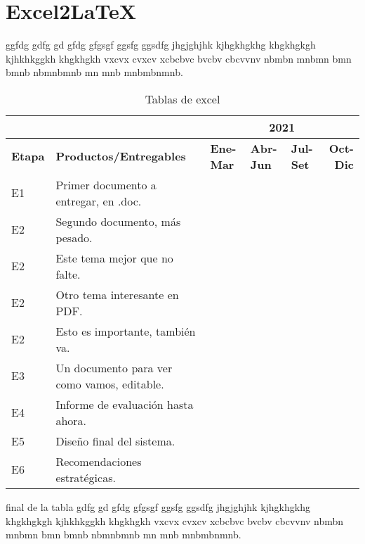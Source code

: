 \section{Excel2LaTeX}

ggfdg gdfg gd gfdg gfgsgf ggsfg ggsdfg jhgjghjhk kjhgkhgkhg khgkhgkgh kjhkhkggkh khgkhgkh vxcvx cvxcv xcbcbvc bvcbv cbcvvnv nbmbn mnbmn bmn bmnb nbmnbmnb mn mnb mnbmbnmnb.

\begin{table}[htbp]
	\centering
	\caption{Tablas de excel}
	\begin{tabular}{p{2.39em}p{15.28em}lllr}
		\multicolumn{1}{l}{} & \multicolumn{1}{r}{} & \multicolumn{4}{c}{\textbf{2021}} \\
		\midrule
		\textbf{Etapa} & \textbf{Productos/Entregables} & \multicolumn{1}{p{4.055em}}{\textbf{Ene-Mar}} & \multicolumn{1}{p{4.055em}}{\textbf{Abr-Jun}} & \multicolumn{1}{p{4.055em}}{\textbf{Jul-Set}} & \multicolumn{1}{p{4.055em}}{\textbf{Oct-Dic}} \\
		\midrule
		E1    & Primer documento a entregar, en .doc. &       & \cellcolor[rgb]{ .718,  .871,  .91} &       &  \\
		E2    & Segundo documento, más pesado. & \cellcolor[rgb]{ .776,  .89,  .859} &       &       &  \\
		E2    & Este tema mejor que no falte. &       & \cellcolor[rgb]{ .776,  .89,  .859} &       &  \\
		E2    & Otro tema interesante en PDF. &       &       & \cellcolor[rgb]{ .776,  .89,  .859} &  \\
		E2    & Esto es importante, también va. &       &       & \cellcolor[rgb]{ .776,  .89,  .859} &  \\
		E3    & Un documento para ver como vamos, editable. &       & \cellcolor[rgb]{ .722,  .804,  .894} &       &  \\
		E4    & Informe de evaluación hasta ahora. &       & \cellcolor[rgb]{ .722,  .804,  .894} &       &  \\
		E5    & Diseño final del sistema. &       &       &       & \cellcolor[rgb]{ .722,  .804,  .894} \\
		E6    & Recomendaciones estratégicas. &       &       &       & \cellcolor[rgb]{ .722,  .804,  .894} \\
		\bottomrule
	\end{tabular}%
	\label{tab:cronograma}%
\end{table}%
final de la tabla gdfg gd gfdg gfgsgf ggsfg ggsdfg jhgjghjhk kjhgkhgkhg khgkhgkgh kjhkhkggkh khgkhgkh vxcvx cvxcv xcbcbvc bvcbv cbcvvnv nbmbn mnbmn bmn bmnb nbmnbmnb mn mnb mnbmbnmnb.

